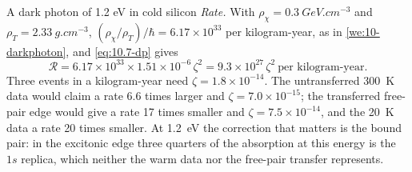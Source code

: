 \begin{workedexample}{A dark photon of 1.2 eV in cold silicon}
\emph{Rate.} With $\rho_\chi = \SI{0.3}{GeV.cm^{-3}}$ and $\rho_T = \SI{2.33}{g.cm^{-3}}$, $(\rho_\chi/\rho_T)/\hbar = 6.17\times10^{33}$ per kilogram-year, as in \cref{we:10-darkphoton}, and \cref{eq:10.7-dp} gives
\begin{equation*}
  \mathcal{R} = 6.17\times10^{33}\times1.51\times10^{-6}\,\zeta^2 = 9.3\times10^{27}\,\zeta^2\ \text{per kilogram-year} .
\end{equation*}
Three events in a kilogram-year need $\zeta = 1.8\times10^{-14}$. The untransferred \SI{300}{K} data would claim a rate 6.6 times larger and $\zeta = 7.0\times10^{-15}$; the transferred free-pair edge would give a rate 17 times smaller and $\zeta = 7.5\times10^{-14}$, and the \SI{20}{K} data a rate 20 times smaller. At \SI{1.2}{eV} the correction that matters is the bound pair: in the excitonic edge three quarters of the absorption at this energy is the $1s$ replica, which neither the warm data nor the free-pair transfer represents.
\end{workedexample}
